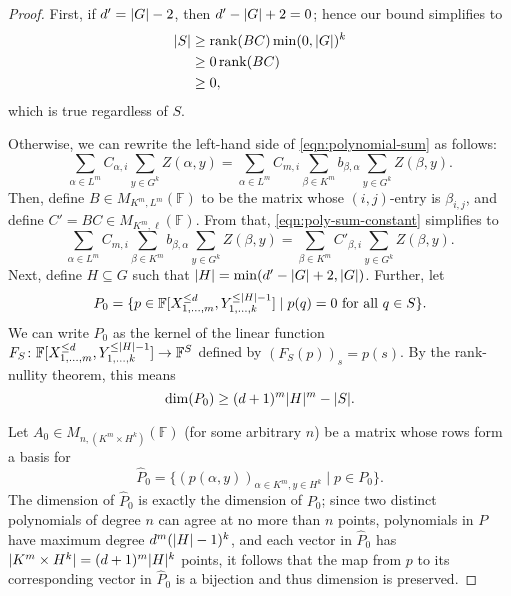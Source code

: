 \documentclass[english,12pt]{reedthesis}
\theoremstyle{plain}
\theoremstyle{definition}
\theoremstyle{remark}
\DeclareMathOperator{\rk}{rank}
\DeclarePairedDelimiter{\abs}{\lvert}{\rvert}
\begin{document}
\begin{proof}
  First, if $d' = \abs{G} - 2$, then $d' - \abs{G} + 2 = 0$; hence our bound
  simplifies to
  \begin{align*}
    \abs{S} &\ge \rk(BC)\min(0, \abs{G})^{k} \\
            &\ge 0\rk(BC) \\
            &\ge 0,
  \end{align*}
  which is true regardless of $S$.

  Otherwise, we can rewrite the left-hand side of \cref{eqn:polynomial-sum} as
  follows:
  \begin{equation}\label{eqn:poly-sum-constant}
    \sum_{\alpha \in L^{m}}C_{\alpha,i}\sum_{y \in G^{k}}Z(\alpha,y) = \sum_{\alpha \in L^{m}}C_{m,i}\sum_{\beta \in K^{m}}b_{\beta,\alpha}\sum_{y \in G^{k}}Z(\beta,y).
  \end{equation}
  Then, define $B \in M_{K^{m},L^{m}}(\mathbb{F})$ to be the matrix whose
  $(i,j)$-entry is $\beta_{i,j}$, and define $C' = BC \in M_{K^{m},\ell}(\mathbb{F})$.
  From that, \cref{eqn:poly-sum-constant} simplifies to
  \begin{equation}\label{eqn:poly-sum-prime}
    \sum_{\alpha \in L^{m}}C_{m,i}\sum_{\beta \in K^{m}}b_{\beta,\alpha}\sum_{y \in G^{k}}Z(\beta,y) = \sum_{\beta \in K^{m}}C'_{\beta,i}\sum_{y \in G^{k}}Z(\beta,y).
  \end{equation}
  Next, define $H \subseteq G$ such that $\abs{H} = \min(d' - \abs{G} + 2, \abs{G})$.
  Further, let
  \[
    P_{0} = \{p \in \mathbb{F}[X_{1, \ldots, m}^{\le d}, Y_{1, \ldots, k}^{\le \abs{H} - 1}]
      \mid p(q) = 0 \text{ for all } q \in S\}.
  \]
  We can write $P_{0}$ as the kernel of the linear function
  $F_{S}\colon \mathbb{F}[X_{1, \ldots, m}^{\le d}, Y_{1, \ldots, k}^{\le \abs{H} - 1}] \rightarrow \mathbb{F}^{S}$
  defined by $(F_{S}(p))_{s} = p(s)$. By the rank-nullity theorem, this means
  \[
    \dim(P_{0}) \ge (d+1)^{m}\abs{H}^{m} - \abs{S}.
  \]

  Let $A_{0} \in M_{n,(K^{m} \times H^{k})}(\mathbb{F})$ (for some arbitrary $n$) be a
  matrix whose rows form a basis for
  \[
    \hat{P}_{0} = \{(p(\alpha,y))_{\alpha \in K^{m},y \in H^{k}} \mid p \in P_{0}\}.
  \]
  The dimension of $\hat{P}_{0}$ is exactly the dimension of $P_{0}$; since two
  distinct polynomials of degree $n$ can agree at no more than $n$ points,
  polynomials in $P$ have maximum degree $d^{m}(\abs{H}-1)^{k}$, and each vector
  in $\hat{P}_{0}$ has $\abs{K^{m} \times H^{k}} = (d+1)^{m}\abs{H}^{k}$ points, it
  follows that the map from $p$ to its corresponding vector in $\hat{P}_{0}$ is
  a bijection and thus dimension is preserved.


\end{proof}
\end{document}
